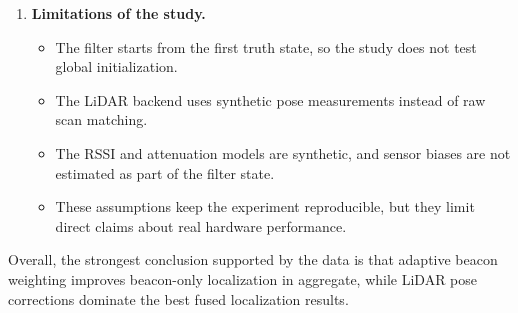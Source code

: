 \begin{enumerate}
\begin{itemize}
        \item Since beacon measurements are intermittent and sometimes underdetermined, they mainly act as supporting corrections rather than the dominant source of localization accuracy.
    \end{itemize}

    \item \textbf{Limitations of the study.}
    \begin{itemize}
        \item The filter starts from the first truth state, so the study does not test global initialization.

        \item The LiDAR backend uses synthetic pose measurements instead of raw scan matching.

        \item The RSSI and attenuation models are synthetic, and sensor biases are not estimated as part of the filter state.

        \item These assumptions keep the experiment reproducible, but they limit direct claims about real hardware performance.
    \end{itemize}
\end{enumerate}

Overall, the strongest conclusion supported by the data is that adaptive beacon weighting improves beacon-only localization in aggregate, while LiDAR pose corrections dominate the best fused localization results.